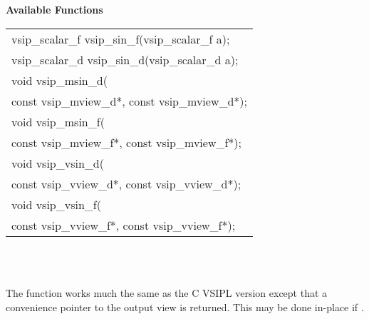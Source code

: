 \\\cvsiplh
\\ \hspace*{.8cm} \vspace*{.1cm} \textbf{Available Functions }
\\ \hspace*{1.1cm} {
\ttfamily
\begin{tabular}[H]{l}
vsip\_scalar\_f vsip\_sin\_f(vsip\_scalar\_f a);\\
vsip\_scalar\_d vsip\_sin\_d(vsip\_scalar\_d a);\\
void vsip\_msin\_d(\\*
\hspace{1cm}const vsip\_mview\_d*, const vsip\_mview\_d*);\\
void vsip\_msin\_f(\\*
\hspace{1cm}const vsip\_mview\_f*, const vsip\_mview\_f*);\\
void vsip\_vsin\_d(\\*
\hspace{1cm}const vsip\_vview\_d*, const vsip\_vview\_d*);\\
void vsip\_vsin\_f(\\*
\hspace{1cm}const vsip\_vview\_f*, const vsip\_vview\_f*);\\
\end{tabular}
}
\\\pyjvsiph
{}
\\ \hspace*{1.2cm}\parbox{10.8cm}{\vspace*{.1cm}The  function works much the same as the C VSIPL version except that a convenience pointer to the output view is returned. This may be done in-place if .}
